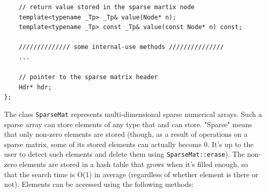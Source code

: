 \begin{lstlisting}
    // return value stored in the sparse martix node
    template<typename _Tp> _Tp& value(Node* n);
    template<typename _Tp> const _Tp& value(const Node* n) const;
    
    ////////////// some internal-use methods ///////////////
    ...

    // pointer to the sparse matrix header
    Hdr* hdr;
};
\end{lstlisting}

The class \texttt{SparseMat} represents multi-dimensional sparse numerical arrays. Such a sparse array can store elements of any type that  and  can store. "Sparse" means that only non-zero elements are stored (though, as a result of operations on a sparse matrix, some of its stored elements can actually become 0. It's up to the user to detect such elements and delete them using \texttt{SparseMat::erase}). The non-zero elements are stored in a hash table that grows when it's filled enough, so that the search time is O(1) in average (regardless of whether element is there or not). Elements can be accessed using the following methods:

